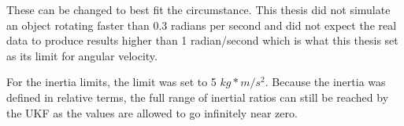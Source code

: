 These can be changed to best fit the circumstance. This thesis did not simulate an object rotating faster than 0.3 radians per second and did not expect the real data to produce results higher than 1 radian/second which is what this thesis set as its limit for angular velocity.

For the inertia limits, the limit was set to 5 $kg*m/s^2$. Because the inertia was defined in relative terms, the full range of inertial ratios can still be reached by the UKF as the values are allowed to go infinitely near zero.